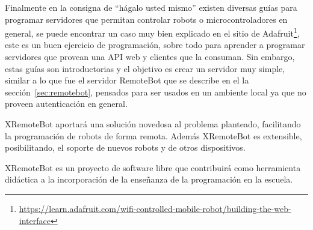 Finalmente en la consigna de ``hágalo usted mismo'' existen diversas guías para
programar servidores que permitan controlar robots o microcontroladores
en general, se puede encontrar un caso muy bien explicado en el sitio
de Adafruit\footnote{\url{https://learn.adafruit.com/wifi-controlled-mobile-robot/building-the-web-interface}},
este es un buen ejercicio de programación, sobre todo para aprender a
programar servidores que provean una API web y clientes que la consuman. Sin
embargo, estas guías son introductorias y el objetivo es crear un servidor
muy simple, similar a lo que fue el servidor RemoteBot que se describe
en el la sección~\ref{sec:remotebot},
pensados para ser
usados en un ambiente local ya que no proveen autenticación en general.

XRemoteBot aportará una solución novedosa al problema planteado, facilitando
la programación de robots de forma remota. Además XRemoteBot es extensible,
posibilitando, el soporte de nuevos robots y de otros dispositivos.

XRemoteBot es un proyecto de software libre que contribuirá como herramienta
didáctica a la incorporación de la enseñanza de la programación en la
escuela.
